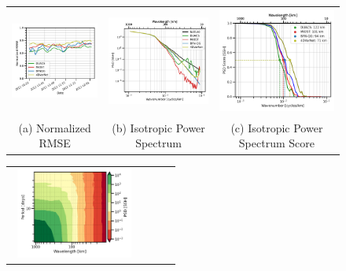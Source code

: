 \begin{figure}[t!]
\small
\begin{center}
\setlength{\tabcolsep}{2pt}
\begin{tabular}{ccc}
\includegraphics[width=3.75cm,height=3.25cm]{00_Oceanbench/content/figures/stats/nrmse_space.png} &
\includegraphics[width=4.25cm,height=3.5cm]{00_Oceanbench/content/figures/psd_isotropic/dc20a/nadir4/dc20a_psd_iso_ssh.png} &
\includegraphics[width=4.25cm,height=3.5cm]{00_Oceanbench/content/figures/psd_isotropic/dc20a/nadir4/dc20a_psd_score_iso_ssh.png} 
\\
(a) Normalized RMSE &
(b) Isotropic Power Spectrum &
(c) Isotropic Power Spectrum Score
\end{tabular}
\begin{tabular}{cccc}
\includegraphics[trim={0 0 0mm 0},clip, width=4.20cm,height=3cm]{00_Oceanbench/content/figures/psd_spacetime/dc20a/nadir4/dc20a_psd_spacetime_nemo_nadir4_ssh.png}  &

\end{tabular}
\end{center}
\end{figure}
